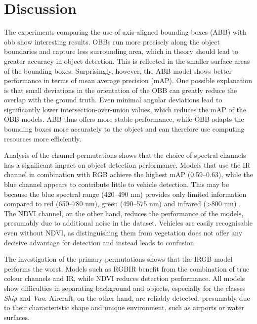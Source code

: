 \chapter{Discussion}
\label{ch:discussion}


The experiments comparing the use of axis-aligned bounding boxes (ABB) with \acrfull{obb} show interesting results. OBBs run more precisely along the object boundaries and capture less surrounding area, which in theory should lead to greater accuracy in object detection. This is reflected in the smaller surface areas of the bounding boxes. Surprisingly, however, the ABB model shows better performance in terms of mean average precision (mAP). One possible explanation is that small deviations in the orientation of the OBB can greatly reduce the overlap with the ground truth. Even minimal angular deviations lead to significantly lower intersection-over-union values, which reduces the mAP of the OBB models. ABB thus offers more stable performance, while OBB adapts the bounding boxes more accurately to the object and can therefore use computing resources more efficiently.
 
Analysis of the channel permutations shows that the choice of spectral channels has a significant impact on object detection performance. Models that use the IR channel in combination with RGB achieve the highest mAP (0.59–0.63), while the blue channel appears to contribute little to vehicle detection. This may be because the blue spectral range (420–490 nm) provides only limited information compared to red (650–780 nm), green (490–575 nm) and infrared (>800 nm) \cite{bfs_Strahlung}. The NDVI channel, on the other hand, reduces the performance of the models, presumably due to additional noise in the dataset. Vehicles are easily recognisable even without NDVI, as distinguishing them from vegetation does not offer any decisive advantage for detection and instead leads to confusion. %

The investigation of the primary permutations shows that the IRGB model performs the worst. Models such as RGBIR benefit from the combination of true colour channels and IR, while NDVI reduces detection performance. All models show difficulties in separating background and objects, especially for the classes \textit{Ship} and \textit{Van}. Aircraft, on the other hand, are reliably detected, presumably due to their characteristic shape and unique environment, such as airports or water surfaces.
 
